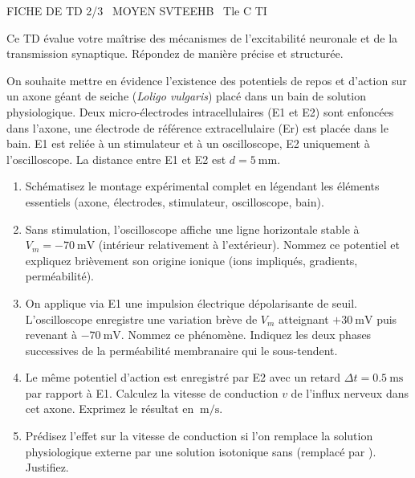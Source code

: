 \documentclass[11pt]{article}
\begin{document}
\begin{tcolorbox}[enhanced,colback=popink,colframe=popink,arc=10pt,boxrule=0pt,left=12pt,right=12pt,top=9pt,bottom=9pt]
{\color{white}\popxbold\small FICHE DE TD 2/3 \textbullet\ MOYEN \hfill SVTEEHB \textbullet\ Tle C TI\par}
\end{tcolorbox}
\vspace{4pt}
Ce TD évalue votre maîtrise des mécanismes de l'excitabilité neuronale et de la transmission synaptique. Répondez de manière précise et structurée.

\begin{exercice}
On souhaite mettre en évidence l'existence des potentiels de repos et d'action sur un axone géant de seiche (\textit{Loligo vulgaris}) placé dans un bain de solution physiologique. Deux micro-électrodes intracellulaires (E1 et E2) sont enfoncées dans l'axone, une électrode de référence extracellulaire (Er) est placée dans le bain. E1 est reliée à un stimulateur et à un oscilloscope, E2 uniquement à l'oscilloscope. La distance entre E1 et E2 est $d = \SI{5}{\milli\meter}$.
\begin{enumerate}
    \item Schématisez le montage expérimental complet en légendant les éléments essentiels (axone, électrodes, stimulateur, oscilloscope, bain).
    \item Sans stimulation, l'oscilloscope affiche une ligne horizontale stable à $V_m = \SI{-70}{\milli\volt}$ (intérieur relativement à l'extérieur). Nommez ce potentiel et expliquez brièvement son origine ionique (ions impliqués, gradients, perméabilité).
    \item On applique via E1 une impulsion électrique dépolarisante de seuil. L'oscilloscope enregistre une variation brève de $V_m$ atteignant $+\SI{30}{\milli\volt}$ puis revenant à $-\SI{70}{\milli\volt}$. Nommez ce phénomène. Indiquez les deux phases successives de la perméabilité membranaire qui le sous-tendent.
    \item Le même potentiel d'action est enregistré par E2 avec un retard $\Delta t = \SI{0,5}{\milli\second}$ par rapport à E1. Calculez la vitesse de conduction $v$ de l'influx nerveux dans cet axone. Exprimez le résultat en $\SI{}{\meter\per\second}$.
    \item Prédisez l'effet sur la vitesse de conduction si l'on remplace la solution physiologique externe par une solution isotonique sans  (remplacé par ). Justifiez.
\end{enumerate}
\end{exercice}
\end{document}
